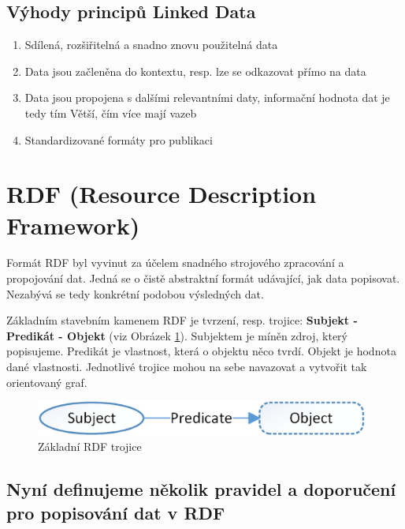 \subsection*{Výhody principů Linked Data}

\begin{enumerate}
\item Sdílená, rozšiřitelná a snadno znovu použitelná data   
\item Data jsou začleněna do kontextu, resp. lze se odkazovat přímo na data
\item Data jsou propojena s dalšími relevantními daty, informační hodnota dat je tedy tím Větší, čím více mají vazeb
\item Standardizované formáty pro publikaci
\end{enumerate}

\newpage

\section{RDF (Resource Description Framework)}

Formát RDF byl vyvinut za účelem snadného strojového zpracování a propojování dat. Jedná se o čistě abstraktní formát udávající, jak data popisovat. Nezabývá se tedy konkrétní podobou výsledných dat. 

Základním stavebním kamenem RDF je tvrzení, resp. trojice: \textbf{Subjekt - Predikát - Objekt} (viz Obrázek \ref{obr:rdf_basic}). Subjektem je míněn zdroj, který popisujeme. Predikát je vlastnost, která o objektu něco tvrdí. Objekt je hodnota dané vlastnosti. Jednotlivé trojice mohou na sebe navazovat a vytvořit tak orientovaný graf.

\begin{figure}[h]
\centerline{\includegraphics[width=110mm]{img/rdf_basic.eps}}
\caption{Základní RDF trojice}
\label{obr:rdf_basic}
\end{figure}

\subsection*{Nyní definujeme několik pravidel a doporučení pro popisování dat v RDF}

